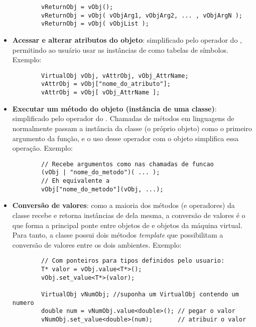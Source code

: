 \begin{itemize}
\begin{lstlisting}
        vReturnObj = vObj();
        vReturnObj = vObj( vObjArg1, vObjArg2, ... , vObjArgN );
        vReturnObj = vObj( vObjList );
      \end{lstlisting}
    \item \textbf{Acessar e alterar atributos do objeto}: simplificado pelo operador
      \lang{[]} do \CXX{}, permitindo ao usuário usar as instâncias de \VObj{} como
      tabelas de símbolos. Exemplo:
      \vspace{1em}
      \begin{lstlisting}
        VirtualObj vObj, vAttrObj, vObj_AttrName;
        vAttrObj = vObj["nome_do_atributo"];
        vAttrObj = vObj[ vObj_AttrName ];
      \end{lstlisting}
    \item \textbf{Executar um método do objeto (instância de uma classe)}: simplificado pelo
      operador \lang{|} do \CXX{}. Chamadas de métodos em linguagens de \script{} normalmente
      passam a instância da classe (o próprio objeto) como o primeiro argumento da
      função, e o uso desse operador com o objeto simplifica essa operação. Exemplo: 
      \vspace{1em}
      \begin{lstlisting}
        // Recebe argumentos como nas chamadas de funcao
        (vObj | "nome_do_metodo")( ... );
        // Eh equivalente a
        vObj["nome_do_metodo"](vObj, ...);
      \end{lstlisting}
    \item \textbf{Conversão de valores}: como a maioria dos métodos (e operadores) da classe
      \VObj{} recebe e retorna instâncias de dela mesma, a conversão de valores é o que forma a
      principal ponte entre objetos de \CXX{} e objetos da máquina virtual. Para tanto, a classe
      possui dois métodos \textit{template}\footnotemark{} que possibilitam a conversão de
      valores entre os dois ambientes. Exemplo:
      \vspace{0.5em}
      \begin{lstlisting}
        // Com ponteiros para tipos definidos pelo usuario:
        T* valor = vObj.value<T*>();
        vObj.set_value<T*>(valor);
        
        VirtualObj vNumObj; //suponha um VirtualObj contendo um numero
        double num = vNumObj.value<double>(); // pegar o valor
        vNumObj.set_value<double>(num);       // atribuir o valor
      \end{lstlisting}
  \end{itemize}

